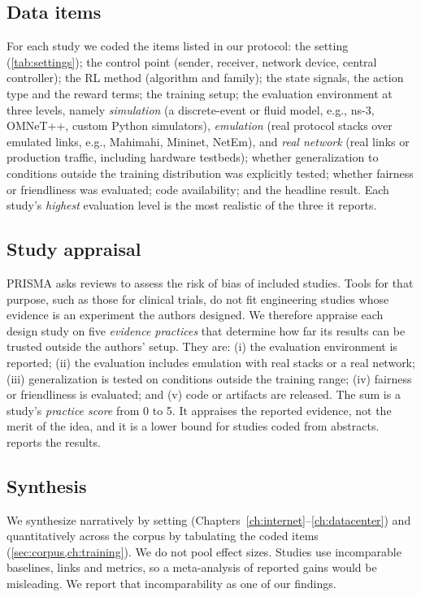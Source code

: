 \subsection{Data items}
\label{sec:items}

For each study we coded the items listed in our protocol: the setting (\cref{tab:settings}); the control point (sender, receiver, network device, central controller); the RL method (algorithm and family); the state signals, the action type and the reward terms; the training setup; the evaluation environment at three levels, namely \emph{simulation} (a discrete-event or fluid model, e.g., ns-3, OMNeT++, custom Python simulators), \emph{emulation} (real protocol stacks over emulated links, e.g., Mahimahi, Mininet, NetEm), and \emph{real network} (real links or production traffic, including hardware testbeds); whether generalization to conditions outside the training distribution was explicitly tested; whether fairness or friendliness was evaluated; code availability; and the headline result. Each study's \emph{highest} evaluation level is the most realistic of the three it reports.

\subsection{Study appraisal}
\label{sec:appraisal}

PRISMA asks reviews to assess the risk of bias of included studies. Tools for that purpose, such as those for clinical trials, do not fit engineering studies whose evidence is an experiment the authors designed. We therefore appraise each design study on five \emph{evidence practices} that determine how far its results can be trusted outside the authors' setup. They are: (i) the evaluation environment is reported; (ii) the evaluation includes emulation with real stacks or a real network; (iii) generalization is tested on conditions outside the training range; (iv) fairness or friendliness is evaluated; and (v) code or artifacts are released. The sum is a study's \emph{practice score} from 0 to 5. It appraises the reported evidence, not the merit of the idea, and it is a lower bound for studies coded from abstracts.  reports the results.

\subsection{Synthesis}
\label{sec:synthesis}

We synthesize narratively by setting (Chapters~\ref{ch:internet}--\ref{ch:datacenter}) and quantitatively across the corpus by tabulating the coded items (\cref{sec:corpus,ch:training}). We do not pool effect sizes. Studies use incomparable baselines, links and metrics, so a meta-analysis of reported gains would be misleading. We report that incomparability as one of our findings.

